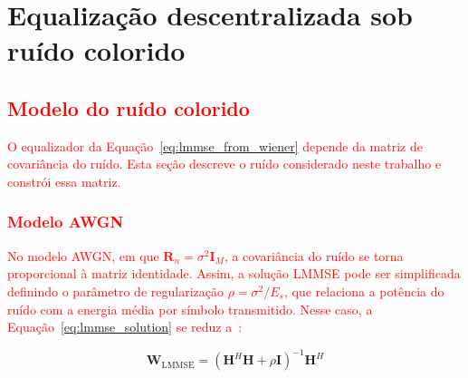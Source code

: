 
\chapter{Equalização descentralizada sob ruído colorido}\label{chap:dbp-ruido}

\section{\texorpdfstring{\textcolor{red}{Modelo do ruído colorido}}{Modelo do ruído colorido}}
\label{sec:ruido-colorido}

\textcolor{red}{O equalizador da Equação~{\hypersetup{linkcolor=red}\eqref{eq:lmmse_from_wiener}} depende da matriz de covariância do ruído. Esta seção descreve o ruído considerado neste trabalho e constrói essa matriz.}

\subsection{\texorpdfstring{\textcolor{red}{Modelo AWGN}}{Modelo AWGN}}

\textcolor{red}{No modelo AWGN, em que $\mathbf{R}_n = \sigma^2\mathbf{I}_M$, a covariância do ruído se torna proporcional à matriz identidade. Assim, a solução LMMSE pode ser simplificada definindo o parâmetro de regularização $\rho = \sigma^2/E_s$, que relaciona a potência do ruído com a energia média por símbolo transmitido. Nesse caso, a Equação~\eqref{eq:lmmse_solution} se reduz a~\cite{jeon2019}:}

\begin{equation}
\mathbf{W}_\text{LMMSE}=
\left(
\mathbf{H}^H\mathbf{H}
+
\rho\mathbf{I}
\right)^{-1}
\mathbf{H}^H
\label{eq:lmmse_awgn}
\end{equation}


